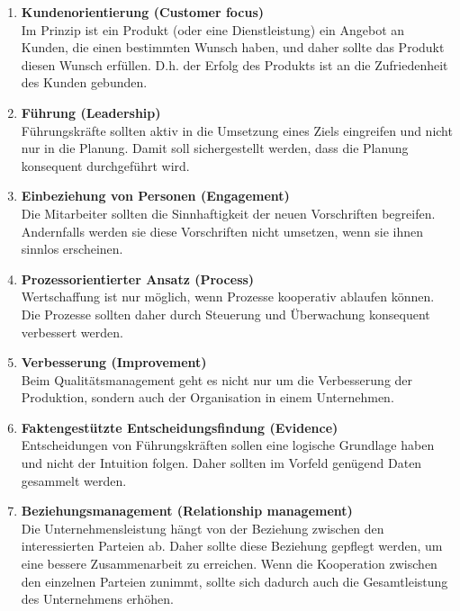 \documentclass[11pt]{scrartcl}       %
\begin{document}
\begin{enumerate}
\item \textbf{Kundenorientierung (Customer focus)} 
\\
Im Prinzip ist ein Produkt (oder eine Dienstleistung) ein Angebot an Kunden, die einen bestimmten Wunsch haben, und daher sollte das Produkt diesen Wunsch erfüllen. D.h. der Erfolg des Produkts ist an die Zufriedenheit des Kunden gebunden.

\item \textbf{Führung (Leadership)} \\
Führungskräfte sollten aktiv in die Umsetzung eines Ziels eingreifen und nicht nur in die Planung. Damit soll sichergestellt werden, dass die Planung konsequent durchgeführt wird.

\item \textbf{Einbeziehung von Personen (Engagement)} \\
Die Mitarbeiter sollten die Sinnhaftigkeit der neuen Vorschriften begreifen. Andernfalls werden sie diese Vorschriften nicht umsetzen, wenn sie ihnen sinnlos erscheinen.

\item \textbf{Prozessorientierter Ansatz (Process)} \\
Wertschaffung ist nur möglich, wenn Prozesse kooperativ ablaufen können. Die Prozesse sollten daher durch Steuerung und Überwachung konsequent verbessert werden.

\item \textbf{Verbesserung (Improvement)} \\
Beim Qualitätsmanagement geht es nicht nur um die Verbesserung der Produktion, sondern auch der Organisation in einem Unternehmen.

\item \textbf{Faktengestützte Entscheidungsfindung (Evidence)} \\
Entscheidungen von Führungskräften sollen eine logische Grundlage haben und nicht der Intuition folgen. Daher sollten im Vorfeld genügend Daten gesammelt werden.

\item \textbf{Beziehungsmanagement (Relationship management)} \\
Die Unternehmensleistung hängt von der Beziehung zwischen den interessierten Parteien ab. Daher sollte diese Beziehung gepflegt werden, um eine bessere Zusammenarbeit zu erreichen. Wenn die Kooperation zwischen den einzelnen Parteien zunimmt, sollte sich dadurch auch die Gesamtleistung des Unternehmens erhöhen.
\end{enumerate}
\end{document}
